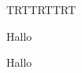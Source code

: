 \documentclass{scrartcl}
\newenvironment{syriac}     %
       {\luatextextdir TRT\luatexpardir TRT\luatexbodydir TRT%
       \syriacfont}{}
\begin{document}
\begin{pages}
    \begin{Leftside}
    \begin{syriac}
    \beginnumbering

\pstart 
        \lipsum[5]
    \pend

    \pstart  %
\pend

    \endnumbering
    \end{syriac}
    \end{Leftside}

    \begin{Rightside}
    \beginnumbering

\pstart
        Hallo
    \pend

\pstart
        Hallo 
    \pend

    \endnumbering
    \end{Rightside}
\end{pages} 
\Pages
\end{document}
